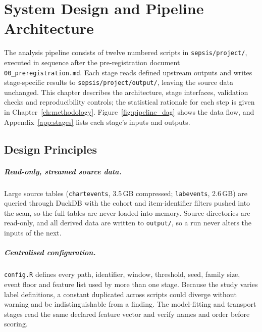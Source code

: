 \chapter{System Design and Pipeline Architecture}
\label{ch:design}

\begin{sloppypar}
The analysis pipeline consists of twelve numbered scripts in
\texttt{sepsis/\allowbreak project/}, executed in sequence after the
pre-registration document \texttt{00\_\allowbreak preregistration.md}. Each
stage reads defined upstream outputs and writes stage-specific results to
\texttt{sepsis/\allowbreak project/\allowbreak output/}, leaving the source data
unchanged. This chapter describes the architecture, stage interfaces,
validation checks and reproducibility controls; the statistical rationale for
each step is given in Chapter~\ref{ch:methodology}. Figure~\ref{fig:pipeline_dag}
shows the data flow, and Appendix~\ref{app:stages} lists each stage's inputs and
outputs.
\end{sloppypar}


\section{Design Principles}
\label{sec:design_principles}

\paragraph{Read-only, streamed source data.}
Large source tables (\texttt{chartevents}, 3.5\,GB compressed;
\texttt{labevents}, 2.6\,GB) are queried through DuckDB with the cohort and
item-identifier filters pushed into the scan, so the full tables are never
loaded into memory. Source directories are read-only, and all derived data are
written to \texttt{output/}, so a run never alters the inputs of the next.

\paragraph{Centralised configuration.}
\texttt{config.R} defines every path, identifier, window, threshold, seed,
family size, event floor and feature list used by more than one stage. Because
the study varies label definitions, a constant duplicated across scripts could
diverge without warning and be indistinguishable from a finding. The
model-fitting and transport stages read the same declared feature vector and
verify names and order before scoring.

